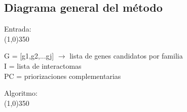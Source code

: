 \subsection{Diagrama general del método}


\bigskip

\begin{flushleft}
\noindent Entrada: \\
\line(1,0){350}
\end{flushleft}

\noindent \hspace*{1cm} G = [g1,g2,...gj] $\rightarrow$ lista de genes candidatos por familia \\
\hspace*{1cm} I = lista de interactomas \\ 
\hspace*{1cm} PC = priorizaciones complementarias \\

\begin{flushleft}
\noindent Algoritmo: \\
\line(1,0){350}
\end{flushleft}


